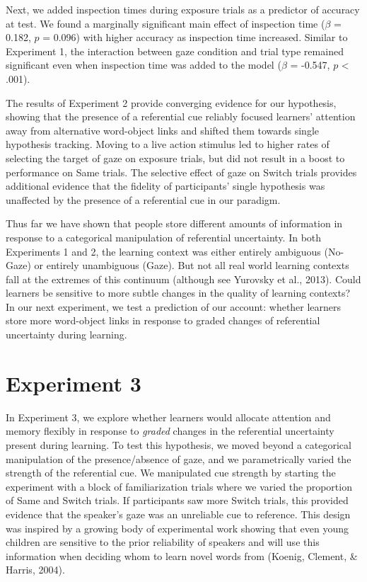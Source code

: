 \documentclass[authoryear, review]{elsarticle}
\begin{document}
Next, we added inspection times during exposure trials as a predictor of
accuracy at test. We found a marginally significant main effect of
inspection time (\(\beta\) = 0.182, \(p\) = 0.096) with higher accuracy
as inspection time increased. Similar to Experiment 1, the interaction
between gaze condition and trial type remained significant even when
inspection time was added to the model (\(\beta\) = -0.547, \(p\)
\textless{} .001).

The results of Experiment 2 provide converging evidence for our
hypothesis, showing that the presence of a referential cue reliably
focused learners' attention away from alternative word-object links and
shifted them towards single hypothesis tracking. Moving to a live action
stimulus led to higher rates of selecting the target of gaze on exposure
trials, but did not result in a boost to performance on Same trials. The
selective effect of gaze on Switch trials provides additional evidence
that the fidelity of participants' single hypothesis was unaffected by
the presence of a referential cue in our paradigm.

Thus far we have shown that people store different amounts of
information in response to a categorical manipulation of referential
uncertainty. In both Experiments 1 and 2, the learning context was
either entirely ambiguous (No-Gaze) or entirely unambiguous (Gaze). But
not all real world learning contexts fall at the extremes of this
continuum (although see Yurovsky et al., 2013). Could learners be
sensitive to more subtle changes in the quality of learning contexts? In
our next experiment, we test a prediction of our account: whether
learners store more word-object links in response to graded changes of
referential uncertainty during learning.

\section{Experiment 3}\label{experiment-3}

In Experiment 3, we explore whether learners would allocate attention
and memory flexibly in response to \emph{graded} changes in the
referential uncertainty present during learning. To test this
hypothesis, we moved beyond a categorical manipulation of the
presence/absence of gaze, and we parametrically varied the strength of
the referential cue. We manipulated cue strength by starting the
experiment with a block of familiarization trials where we varied the
proportion of Same and Switch trials. If participants saw more Switch
trials, this provided evidence that the speaker's gaze was an unreliable
cue to reference. This design was inspired by a growing body of
experimental work showing that even young children are sensitive to the
prior reliability of speakers and will use this information when
deciding whom to learn novel words from (Koenig, Clement, \& Harris,
2004).
\end{document}
